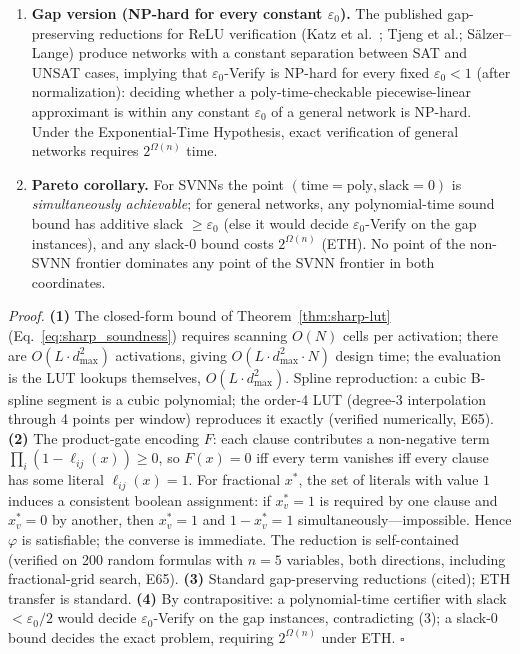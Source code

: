 \begin{theorem}
\begin{enumerate}
    \item \textbf{Gap version (NP-hard for every constant $\varepsilon_0$).}
    The published gap-preserving reductions for ReLU verification
    (Katz et al.~\cite{katz2017reluplex}; Tjeng et al.; S\"{a}lzer--Lange)
    produce networks with a constant separation between SAT and UNSAT
    cases, implying that $\varepsilon_0$-Verify is NP-hard for every fixed
    $\varepsilon_0 < 1$ (after normalization): deciding whether a
    poly-time-checkable piecewise-linear approximant is within any constant
    $\varepsilon_0$ of a general network is NP-hard. Under the
    Exponential-Time Hypothesis, exact verification of general networks
    requires $2^{\Omega(n)}$ time.

    \item \textbf{Pareto corollary.} For SVNNs the point
    $(\mathrm{time} = \mathrm{poly}, \mathrm{slack} = 0)$ is
    \emph{simultaneously achievable}; for general networks, any
    polynomial-time sound bound has additive slack $\geq \varepsilon_0$
    (else it would decide $\varepsilon_0$-Verify on the gap instances),
    and any slack-$0$ bound costs $2^{\Omega(n)}$ (ETH). No point of the
    non-SVNN frontier dominates any point of the SVNN frontier in both
    coordinates.
\end{enumerate}
\end{theorem}

\vspace{2pt}
\noindent\textit{Proof.}
\textbf{(1)} The closed-form bound of Theorem~\ref{thm:sharp-lut}
(Eq.~\ref{eq:sharp_soundness}) requires scanning $O(N)$ cells per
activation; there are $O(L \cdot d_{\max}^2)$ activations, giving
$O(L \cdot d_{\max}^2 \cdot N)$ design time; the evaluation is the
LUT lookups themselves, $O(L \cdot d_{\max}^2)$. Spline reproduction:
a cubic B-spline segment is a cubic polynomial; the order-4 LUT
(degree-3 interpolation through 4 points per window) reproduces it
exactly (verified numerically, E65). \textbf{(2)} The product-gate
encoding $F$: each clause contributes a non-negative term
$\prod_i (1 - \ell_{ij}(x)) \geq 0$, so $F(x) = 0$ iff every term
vanishes iff every clause has some literal $\ell_{ij}(x) = 1$. For
fractional $x^*$, the set of literals with value $1$ induces a
consistent boolean assignment: if $x^*_v = 1$ is required by one clause
and $x^*_v = 0$ by another, then $x^*_v = 1$ and $1 - x^*_v = 1$
simultaneously---impossible. Hence $\varphi$ is satisfiable; the
converse is immediate. The reduction is self-contained (verified on
200 random formulas with $n = 5$ variables, both directions, including
fractional-grid search, E65). \textbf{(3)} Standard gap-preserving
reductions (cited); ETH transfer is standard. \textbf{(4)} By
contrapositive: a polynomial-time certifier with slack $< \varepsilon_0/2$
would decide $\varepsilon_0$-Verify on the gap instances, contradicting
(3); a slack-$0$ bound decides the exact problem, requiring
$2^{\Omega(n)}$ under ETH. $\square$

